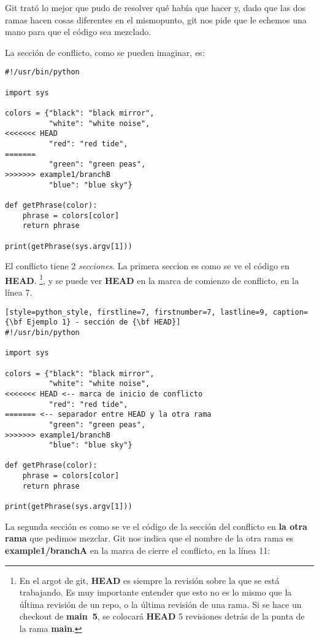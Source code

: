 Git trató lo mejor que pudo de resolver qué había que hacer y, dado que las dos ramas hacen cosas diferentes en el
mismopunto, git nos pide que le echemos una mano para que el código sea mezclado.

La sección de conflicto, como se pueden imaginar, es:
\begin{lstlisting}[style=python_style, firstline=7, firstnumber=7, lastline=11, caption={\bf Ejemplo 1} - Sección en conflicto]
#!/usr/bin/python

import sys

colors = {"black": "black mirror",
          "white": "white noise",
<<<<<<< HEAD
          "red": "red tide",
=======
          "green": "green peas",
>>>>>>> example1/branchB
          "blue": "blue sky"}

def getPhrase(color):
    phrase = colors[color]
    return phrase

print(getPhrase(sys.argv[1]))
\end{lstlisting}

El conflicto tiene 2 {\it secciones}. La primera seccion es como se ve el código en {\bf HEAD}.
\footnote{En el argot de git, {\bf HEAD} es siempre la revisión sobre la que se está trabajando. Es muy importante entender
que esto no es lo mismo que la úĺtima revisión de un repo, o la última revisión de una rama. Si se hace un checkout de
{\bf main~5}, se colocará {\bf HEAD} 5 revisiones detrás de la punta de la rama {\bf main}.}, y se puede ver {\bf HEAD} en la
marca de comienzo de conflicto, en la línea 7.

\begin{lstlisting}[style=python_style, firstline=7, firstnumber=7, lastline=9, caption={\bf Ejemplo 1} - sección de {\bf HEAD}]
#!/usr/bin/python

import sys

colors = {"black": "black mirror",
          "white": "white noise",
<<<<<<< HEAD <-- marca de inicio de conflicto
          "red": "red tide",
======= <-- separador entre HEAD y la otra rama
          "green": "green peas",
>>>>>>> example1/branchB
          "blue": "blue sky"}

def getPhrase(color):
    phrase = colors[color]
    return phrase

print(getPhrase(sys.argv[1]))
\end{lstlisting}

La segunda sección es como se ve el código de la sección del conflicto en {\bf la otra rama} que pedimos mezclar. Git
nos indica que el nombre de la otra rama es {\bf example1/branchA} en la marca de cierre el conflicto, en la línea 11:

